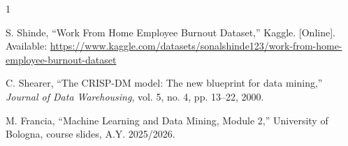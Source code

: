 \documentclass[conference]{IEEEtran}
\begin{document}
\begin{thebibliography}{1}

S. Shinde, ``Work From Home Employee Burnout Dataset,'' Kaggle. [Online].
Available:
\url{https://www.kaggle.com/datasets/sonalshinde123/work-from-home-employee-burnout-dataset}

C. Shearer, ``The CRISP-DM model: The new blueprint for data mining,''
\emph{Journal of Data Warehousing}, vol. 5, no. 4, pp. 13--22, 2000.

M. Francia, ``Machine Learning and Data Mining, Module 2,'' University of
Bologna, course slides, A.Y. 2025/2026.

\end{thebibliography}
\end{document}
